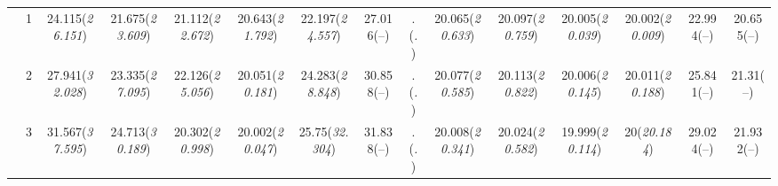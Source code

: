 \documentclass{article}
\begin{document}
\begin{table}[tbp]
{\begin{tabularx}{\textwidth}{lCCCCCCCCCCCCCC}
&1&24.115\newline (\emph{26.151})&21.675\newline (\emph{23.609})&21.112\newline (\emph{22.672})&20.643\newline (\emph{21.792})&22.197\newline (\emph{24.557})&27.016\newline (--)&.\newline (\emph{.})&20.065\newline (\emph{20.633})&20.097\newline (\emph{20.759})&20.005\newline (\emph{20.039})&20.002\newline (\emph{20.009})&22.994\newline (--)&20.655\newline (--) \tabularnewline
&2&27.941\newline (\emph{32.028})&23.335\newline (\emph{27.095})&22.126\newline (\emph{25.056})&20.051\newline (\emph{20.181})&24.283\newline (\emph{28.848})&30.858\newline (--)&.\newline (\emph{.})&20.077\newline (\emph{20.585})&20.113\newline (\emph{20.822})&20.006\newline (\emph{20.145})&20.011\newline (\emph{20.188})&25.841\newline (--)&21.31\newline (--) \tabularnewline
&3&31.567\newline (\emph{37.595})&24.713\newline (\emph{30.189})&20.302\newline (\emph{20.998})&20.002\newline (\emph{20.047})&25.75\newline (\emph{32.304})&31.838\newline (--)&.\newline (\emph{.})&20.008\newline (\emph{20.341})&20.024\newline (\emph{20.582})&19.999\newline (\emph{20.114})&20\newline (\emph{20.184})&29.024\newline (--)&21.932\newline (--) \tabularnewline

\end{tabularx}}
\end{table}
\end{document}
